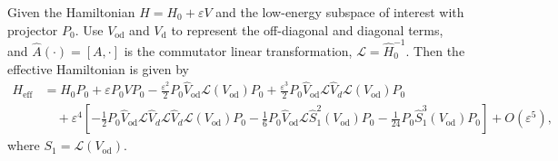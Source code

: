 \begin{lemma}
\label{lem:perturbation_expand}
Given the Hamiltonian $H = H_0 + \varepsilon V$ and the low-energy subspace of interest with projector $P_0$. Use $V_{\mathrm{od}}$ and $V_{\mathrm{d}}$ to represent the off-diagonal and diagonal terms, and $\hat{A}(\cdot) = [A, \cdot]$ is the commutator linear transformation, $\mathcal{L} = \hat{H}^{-1}_0$. Then the effective Hamiltonian is given by
\begin{align}
H_{\mathrm{eff}}
&=H_0P_0+\varepsilon P_0VP_0
-\frac{\varepsilon^2}{2}P_0\hat V_{\mathrm{od}}\mathcal L(V_{\mathrm{od}})P_0
+\frac{\varepsilon^3}{2}P_0\hat V_{\mathrm{od}}\mathcal L\hat V_d\mathcal L(V_{\mathrm{od}})P_0\\
& \quad+  \varepsilon^4 \left[-\frac12P_0\hat V_{\mathrm{od}}\mathcal L\hat V_d\mathcal L\hat V_d\mathcal L(V_{\mathrm{od}})P_0 -\frac16P_0\hat V_{\mathrm{od}}\mathcal L\hat S_1^2(V_{\mathrm{od}})P_0 -\frac1{24}P_0\hat S_1^3(V_{\mathrm{od}})P_0\right]+O(\varepsilon^5),
\end{align}
where $S_1=\mathcal L(V_{\mathrm{od}})$.
\end{lemma}

